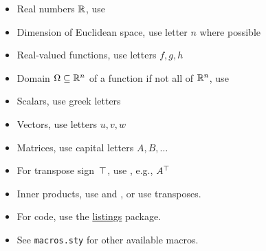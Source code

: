 \documentclass[12pt]{article}
\begin{document}
\begin{itemize}
\item Real numbers $\mathbb{R}$, use 
\item Dimension of Euclidean space, use letter $n$ where possible
\item Real-valued functions, use letters $f, g, h$
\item Domain $\Omega\subseteq\mathbb{R}^n$ of a function if not all of $\mathbb{R}^n$, use 
\item Scalars, use greek letters
\item Vectors, use letters $u, v, w$
\item Matrices, use capital letters $A, B, \dots$
\item For transpose sign~$\top$, use , e.g., $A^\top$
\item Inner products, use  and , or use transposes.
\item For code, use the \href{https://en.wikibooks.org/wiki/LaTeX/Source_Code_Listings}{listings} package.
\item See {\tt macros.sty} for other available macros.
\end{itemize}
\end{document}
